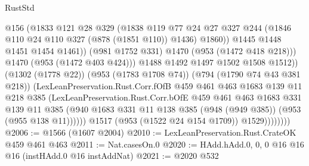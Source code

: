 \begin{lexlean}{RustStd}
\begin{coremodule}
                                  @156
                                  (@1833
                                    @121
                                    @28
                                    @329
                                    (@1838
                                      @119
                                      @77
                                      @24
                                      @27
                                      @327
                                      @244
                                      (@1846 @110 @24 @110 @327 (@878 (@1851 @110)) @1436)
                                      @1860))
                                  @1445
                                  @1448
                                  @1451
                                  @1454
                                  @1461))
                              (@981 @1752 @331)
                              @1470
                              (@953 (@1472 @418 @218)))
                            @1470
                            (@953 (@1472 @403 @424)))
                          @1488
                          @1492
                          @1497
                          @1502
                          @1508
                          @1512))
                      (@1302 (@1778 @22))
                      (@953 (@1783 @1708 @74))
                      (@794 (@1790 @74 @43 @381 @218))
                      (LexLeanPreservation.Rust.Corr.fOfB
                        @459
                        @461
                        @463
                        @1683
                        @139
                        @11
                        @218
                        @385
                        (LexLeanPreservation.Rust.Corr.bOfE
                          @459
                          @461
                          @463
                          @1683
                          @331
                          @139
                          @11
                          @385
                          (@940
                            @1683
                            @331
                            @11
                            @138
                            @385
                            (@948 (@949 @385))
                            (@953 (@955 @138 @11))))))
                    @1517
                    (@953 (@1522 @24 @154 @1709))
                    @1529))))))))
@2006 := @1566 (@1607 @2004)
@2010 := LexLeanPreservation.Rust.CrateOK @459 @461 @463
@2011 := Nat.casesOn.{0}
@2020 := HAdd.hAdd.{0, 0, 0} @16 @16 @16 (instHAdd.{0} @16 instAddNat)
@2021 := @2020 @532

\end{coremodule}
\end{lexlean}
